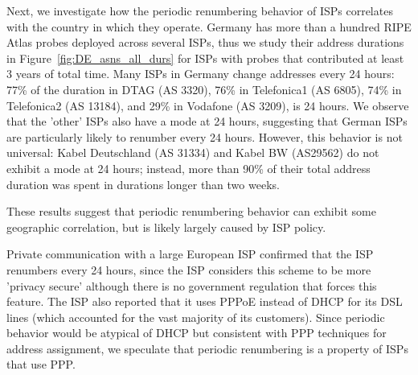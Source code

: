 Next, we investigate how the periodic renumbering behavior of ISPs
correlates with the country in which they operate. 
Germany has more than a hundred RIPE Atlas probes deployed across
several ISPs, thus we study their
address durations in Figure~\ref{fig:DE_asns_all_durs} for ISPs
with probes that contributed at least 3 years of total time. 
Many ISPs in Germany change addresses every 24 hours: 77\% of the duration in DTAG
(AS 3320), 76\% in Telefonica1 (AS 6805), 74\% in Telefonica2 (AS
13184), and 29\% in Vodafone (AS 3209), is 24 hours. We observe
that the 'other' ISPs also have a mode at 24 hours, suggesting that
German ISPs are particularly likely to renumber every 24
hours. However, this behavior is not universal: Kabel
Deutschland (AS 31334) and
Kabel BW (AS29562) do not exhibit a mode at 24 hours; instead, more than 90\% of their
total address duration was spent in durations longer than two weeks. 

These results suggest that periodic renumbering behavior can exhibit
some geographic correlation, but is likely
largely caused by ISP policy. 

Private communication with a large European ISP confirmed that the ISP renumbers every 24
hours, since the ISP considers this scheme to be more 'privacy secure' although
there is no government regulation that forces this feature. The ISP
also reported that it uses PPPoE instead of DHCP for its DSL
lines (which accounted for the vast majority of its customers). Since
periodic behavior would be atypical of DHCP but consistent with PPP
techniques for address assignment, we speculate that periodic
renumbering is a property of ISPs that use PPP.

